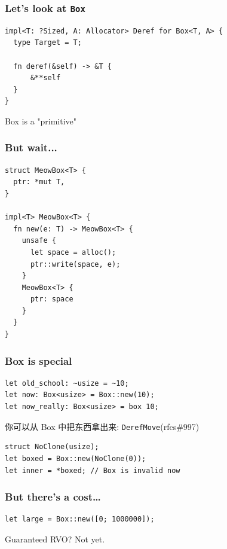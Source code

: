 \documentclass[UTF-8]{ctexbeamer}
\begin{document}
\begin{frame}[fragile]
  \frametitle{Let's look at \texttt{Box}}

  \begin{verbatim}
impl<T: ?Sized, A: Allocator> Deref for Box<T, A> {
  type Target = T;

  fn deref(&self) -> &T {
      &**self
  }
}
  \end{verbatim}

  \pause
  \vspace{1em}

  Box is a "primitive"
\end{frame}

\begin{frame}[fragile]
  \frametitle{But wait...}

  \begin{verbatim}
struct MeowBox<T> {
  ptr: *mut T,
}

impl<T> MeowBox<T> {
  fn new(e: T) -> MeowBox<T> {
    unsafe {
      let space = alloc();
      ptr::write(space, e);
    }
    MeowBox<T> {
      ptr: space
    }
  }
}
  \end{verbatim}
\end{frame}

\begin{frame}[fragile]
  \frametitle{Box is special}

  \begin{verbatim}
let old_school: ~usize = ~10;
let now: Box<usize> = Box::new(10);
let now_really: Box<usize> = box 10;
  \end{verbatim}

  \pause
  \vspace{1em}

  你可以从 Box 中把东西拿出来: \texttt{DerefMove}(rfcs\#997)

  \begin{verbatim}
struct NoClone(usize);
let boxed = Box::new(NoClone(0));
let inner = *boxed; // Box is invalid now
  \end{verbatim}
\end{frame}

\begin{frame}[fragile]
  \frametitle{But there's a cost\dots}

  \begin{verbatim}
let large = Box::new([0; 1000000]);
  \end{verbatim}

  \pause
  \vspace{1em}
  Guaranteed RVO? Not yet.
\end{frame}
\end{document}
